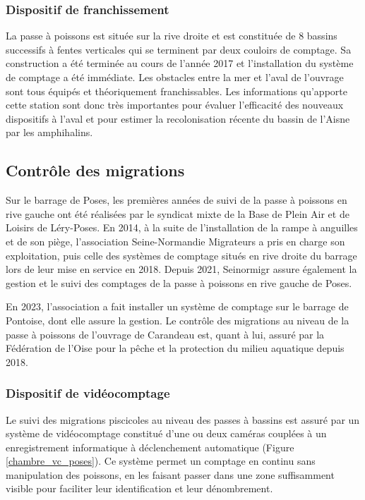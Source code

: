 \documentclass[11pt,twoside]{article}\usepackage[]{graphicx}\usepackage[table]{xcolor}
\begin{document}
\subsubsection{Dispositif de franchissement}

La passe à poissons est située sur la rive droite et est constituée de 8 bassins successifs à fentes verticales qui se terminent par deux couloirs de comptage. Sa construction a été terminée au cours de l'année 2017 et l'installation du système de comptage a été immédiate. Les obstacles entre la mer et l’aval de l’ouvrage sont tous équipés et théoriquement franchissables. Les informations qu’apporte cette station sont donc très importantes pour évaluer l’efficacité des nouveaux dispositifs à l’aval et pour estimer la recolonisation récente du bassin de l’Aisne par les amphihalins.

\subsection{Contrôle des migrations}

Sur le barrage de Poses, les premières années de suivi de la passe à poissons en rive gauche ont été réalisées par le syndicat mixte de la Base de Plein Air et de Loisirs de Léry-Poses. En 2014, à la suite de l’installation de la rampe à anguilles et de son piège, l’association Seine-Normandie Migrateurs a pris en charge son exploitation, puis celle des systèmes de comptage situés en rive droite du barrage lors de leur mise en service en 2018. Depuis 2021, Seinormigr assure également la gestion et le suivi des comptages de la passe à poissons en rive gauche de Poses.

En 2023, l’association a fait installer un système de comptage sur le barrage de Pontoise, dont elle assure la gestion.
Le contrôle des migrations au niveau de la passe à poissons de l’ouvrage de Carandeau est, quant à lui, assuré par la Fédération de l’Oise pour la pêche et la protection du milieu aquatique depuis 2018.

\subsubsection{Dispositif de vidéocomptage}

Le suivi des migrations piscicoles au niveau des passes à bassins est assuré par un système de vidéocomptage constitué d'une ou deux caméras couplées à un enregistrement informatique à déclenchement automatique (Figure \ref{chambre_vc_poses}). Ce système permet un comptage en continu sans manipulation des poissons, en les faisant passer dans une zone suffisamment visible pour faciliter leur identification et leur dénombrement.
\end{document}
